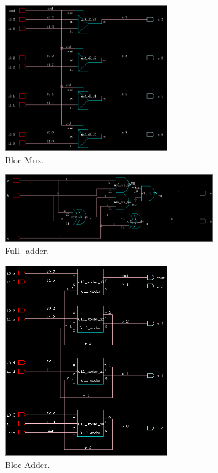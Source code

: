 \documentclass[12pt]{article}
\begin{document}
\begin{figure}
\begin{center}
  \includegraphics[width = 7cm]{pic/mux.png}
\end{center}
\caption{Bloc Mux.}
\end{figure}
 
\begin{figure}
\begin{center}
  \includegraphics[width = 9cm]{pic/fa.png}
\end{center}
\caption{Full\_adder.}
\end{figure}

\begin{figure}
\begin{center}
  \includegraphics[width = 7cm]{pic/adder.png}
\end{center}
\caption{Bloc Adder.}
\end{figure}
\end{document}
